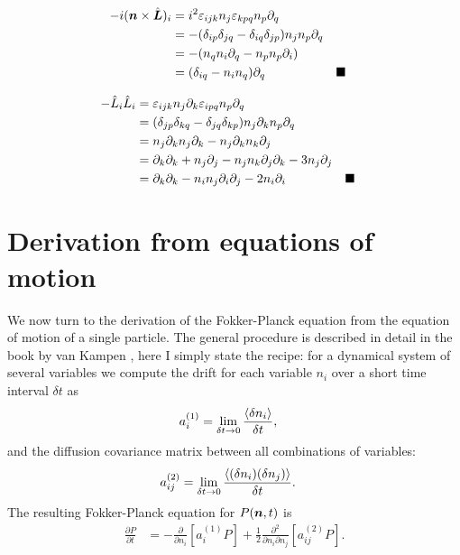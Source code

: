 \documentclass[thesis.tex]{subfiles}
\begin{document}
\begin{align*}
	-i(\ve n \cross \hat{\ve L})_i &= i^2 \lc_{ijk}n_j\lc_{kpq}n_p\partial_q \\
	&= -(\delta_{ip}\delta_{jq}-\delta_{iq}\delta_{jp})n_jn_p\partial_q \\
	&= -(n_qn_i\partial_q - n_pn_p\partial_i) \\%
	&= (\delta_{iq} - n_in_q)\partial_q && \blacksquare
\end{align*}

\begin{align*}
	-\hat L_i\hat L_i &= \varepsilon_{ijk}n_j\partial_k\varepsilon_{ipq}n_p\partial_q \\
	&= (\delta_{jp}\delta_{kq}-\delta_{jq}\delta_{kp})n_j\partial_kn_p\partial_q \\
	&= n_j\partial_kn_j\partial_k - n_j\partial_kn_k\partial_j \\
	&= \partial_k\partial_k + n_j \partial_j - n_j n_k \partial_j \partial_k - 3 n_j \partial_j\\
	&= \partial_k \partial_k - n_i n_j\partial_i\partial_j-2n_i\partial_i && \blacksquare
\end{align*}

\section{Derivation from equations of motion}
We now turn to the derivation of the Fokker-Planck equation from the equation of motion of a single particle. The general procedure is described in detail in the book by van Kampen \cite{kampen2007}, here I simply state the recipe: for a dynamical system of several variables we compute the drift for each variable $n_i$ over a short time interval $\delta t$ as
\begin{align}
	a^{(1)}_i &= \lim_{\delta t\to0}\frac{\langle \delta n_i\rangle}{\delta t},\eqnlab{a1def}
\end{align}
and the diffusion covariance matrix between all combinations of variables:
\begin{align}
	a^{(2)}_{ij} &= \lim_{\delta t\to0}\frac{\langle (\delta n_i)(\delta n_j)\rangle}{\delta t}.\eqnlab{a2def}
\end{align}
The resulting Fokker-Planck equation for $P(\mbox{\boldmath$n$}, t)$ is
\begin{align*}
	\frac{\partial P}{\partial t} &= -\frac{\partial}{\partial n_i}\left[a^{(1)}_i P\right] + \frac{1}{2}\frac{\partial^2}{\partial n_i \partial n_j}\left[a^{(2)}_{ij} P\right].
\end{align*}
\end{document}
